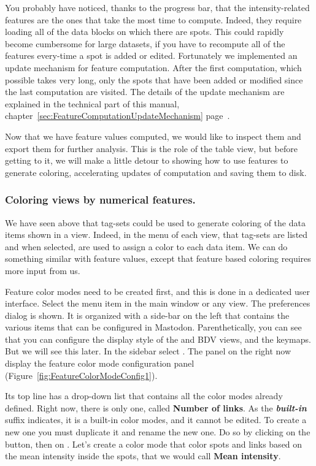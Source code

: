 You probably have noticed, thanks to the progress bar, that the intensity-related features are the ones that take the most time to compute. 
Indeed, they require loading all of the data blocks on which there are spots.
This could  rapidly become cumbersome for large datasets, if you have to recompute all of the features every-time a spot is added or edited. 
Fortunately we implemented an update mechanism for feature computation.
After the first computation, which possible takes very long, only the spots that have been added or modified since the last computation are visited.
The details of the update mechanism are explained in the technical part of this manual, chapter~\ref{sec:FeatureComputationUpdateMechanism} page~\pageref{sec:FeatureComputationUpdateMechanism}.

Now that we have feature values computed, we would like to inspect them and export them for further analysis.
This is the role of the table view, but before getting to it, we will make a little detour to showing how to use features to generate coloring, accelerating updates of computation and saving them to disk.


\subsubsection{Coloring views by numerical features.}
\label{sec:ConfigureColorModes}

We have seen above that tag-sets could be used to generate coloring of the data items shown in a view. 
Indeed, in the  menu of each view, that tag-sets are listed and when selected, are used to assign a color to each data item.
We can do something similar with feature values, except that feature based coloring requires more input from us.

Feature color modes need to be created first, and this is done in a dedicated user interface. 
Select the  menu item in the main window or any view.
The preferences dialog is shown.
It is organized with a side-bar on the left that contains the various items that can be configured in Mastodon. 
Parenthetically, you can see that you can configure the display style of the \TrackScheme and BDV views, and the keymaps. 
But we will see this later.
In the sidebar select .
The panel on the right now display the feature color mode configuration panel (Figure~\ref{fig:FeatureColorModeConfig1}).

Its top line has a drop-down list that contains all the color modes already defined. 
Right now, there is only one, called \textbf{Number of links}.
As the \textbf{\textit{built-in}} suffix indicates, it is a built-in color modes, and it cannot be edited. 
To create a new one you must duplicate it and rename the new one.   
Do so by clicking on the  button, then on .
Let's create a color mode that color spots and links based on the mean intensity inside the spots, that we would call \textbf{Mean intensity}.


